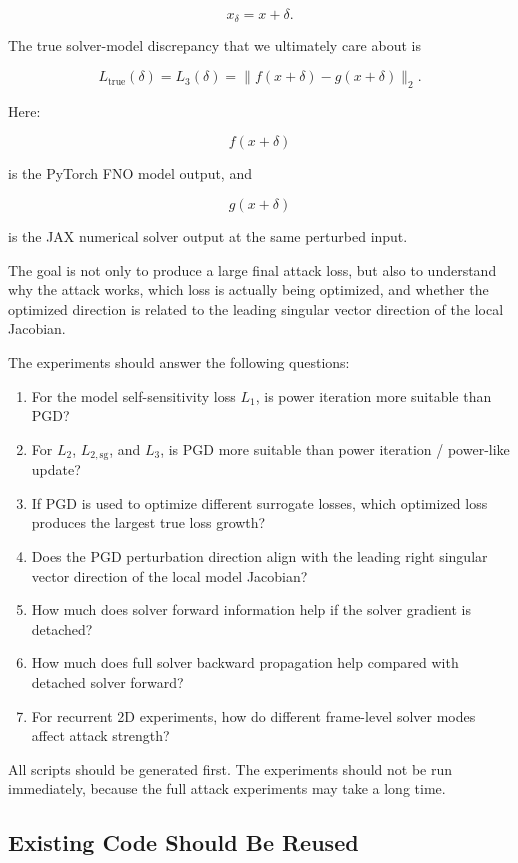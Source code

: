 \documentclass{article}
\begin{document}
\[
x_\delta = x+\delta.
\]

The true solver-model discrepancy that we ultimately care about is

\[
L_{\mathrm{true}}(\delta)
=
L_3(\delta)
=
\|f(x+\delta)-g(x+\delta)\|_2.
\]

Here:

\[
f(x+\delta)
\]

is the PyTorch FNO model output, and

\[
g(x+\delta)
\]

is the JAX numerical solver output at the same perturbed input.

The goal is not only to produce a large final attack loss, but also to understand why the attack works, which loss is actually being optimized, and whether the optimized direction is related to the leading singular vector direction of the local Jacobian.

The experiments should answer the following questions:

\begin{enumerate}
    \item For the model self-sensitivity loss \(L_1\), is power iteration more suitable than PGD?
    \item For \(L_2\), \(L_{2,\mathrm{sg}}\), and \(L_3\), is PGD more suitable than power iteration / power-like update?
    \item If PGD is used to optimize different surrogate losses, which optimized loss produces the largest true loss growth?
    \item Does the PGD perturbation direction align with the leading right singular vector direction of the local model Jacobian?
    \item How much does solver forward information help if the solver gradient is detached?
    \item How much does full solver backward propagation help compared with detached solver forward?
    \item For recurrent 2D experiments, how do different frame-level solver modes affect attack strength?
\end{enumerate}

All scripts should be generated first. The experiments should not be run immediately, because the full attack experiments may take a long time.

\subsection{Existing Code Should Be Reused}
\end{document}
